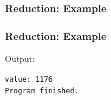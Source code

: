 \begin{frame}[fragile]
  \frametitle{Reduction: Example}
  
\end{frame}

\begin{frame}[fragile]
  \frametitle{Reduction: Example}
  
Output:
  \begin{lstlisting}[basicstyle=\tiny]
value: 1176
Program finished.
  \end{lstlisting}
\end{frame}
